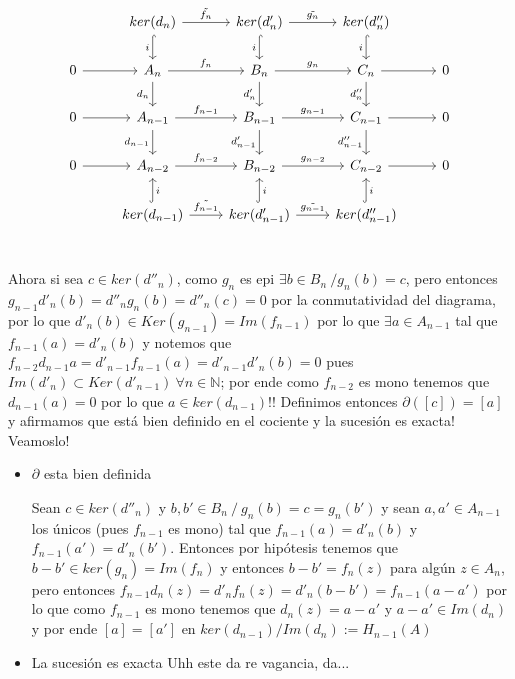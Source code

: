 \documentclass[11pt,a4paper,oneside]{article}
\newcommand{\N}{{\mathbb{N}}}
\newenvironment{proof}[1][Demostraci\'on]{\begin{trivlist}
\item[\hskip \labelsep {\bfseries #1}]}{\end{trivlist}}
\begin{document}
\begin{enumerate}
\begin{proof}
\[
\begin{tikzcd}
& ker(d_n) \arrow[swap,hook]{d}{i} \arrow{r}{\tilde{f_n}} & ker(d'_n) \arrow[swap,hook]{d}{i} \arrow{r}{\tilde{g_n}} & ker(d''_n) \arrow[swap,hook]{d}{i} & \\
0 \rar & A_n \arrow[swap]{d}{d_n} \arrow{r}{f_n} & B_n \arrow[swap]{d}{d'_n} \arrow{r}{g_n} & C_n \arrow[swap]{d}{d''_n} \rar & 0 \\
0 \rar & A_{n-1} \arrow{r}{f_{n-1}} \arrow[swap]{d}{d_{n-1}} & B_{n-1} \arrow{r}{g_{n-1}} \arrow[swap]{d}{d'_{n-1}} & C_{n-1} \rar \arrow[swap]{d}{d''_{n-1}} & 0 \\
0 \rar & A_{n-2} \arrow{r}{f_{n-2}} & B_{n-2} \arrow{r}{g_{n-2}}& C_{n-2} \rar & 0 \\
& ker(d_{n-1}) \arrow[swap,hook]{u}{i} \arrow{r}{\tilde{f_{n-1}}} & ker(d'_{n-1}) \arrow[swap,hook]{u}{i} \arrow{r}{\tilde{g_{n-1}}} & ker(d''_{n-1}) \arrow[swap,hook]{u}{i} & \\
\end{tikzcd}
\]

Ahora si sea $c \in ker(d''_n)$, como $g_n$ es epi $\exists b \in B_n \ / g_n(b)=c$, pero entonces $g_{n-1}d'_n(b) = d''_n g_n(b)= d''_n(c) = 0$ por la conmutatividad del diagrama, por lo que $d'_n(b) \in Ker(g_{n-1})=Im(f_{n-1})$ por lo que $\exists a \in A_{n-1}$ tal que $f_{n-1}(a)=d'_n(b)$ y notemos que $f_{n-2}d_{n-1}a = d'_{n-1}f_{n-1}(a)=d'_{n-1}d'_{n}(b)=0$ pues $Im(d'_n)\subset Ker(d'_{n-1}) \ \forall n \in \N$; por ende como $f_{n-2}$ es mono tenemos que $d_{n-1}(a)=0$ por lo que $a \in ker(d_{n-1})$!! Definimos entonces $\partial([c])=[a]$ y afirmamos que est\'a bien definido en el cociente y la sucesi\'on es exacta! Veamoslo!

\begin{itemize}

\item {$\partial$ esta bien definida}

Sean $c \in ker(d''_n)$ y $b,b' \in B_n \ / \ g_n(b)=c=g_n(b')$ y sean $a,a' \in A_{n-1}$ los \'unicos (pues $f_{n-1}$ es mono) tal que $f_{n-1}(a)=d'_n(b)$ y $f_{n-1}(a')=d'_n(b')$. Entonces por hip\'otesis tenemos que $b-b' \in ker(g_n)=Im(f_n)$ y entonces $b-b'=f_n(z)$ para alg\'un $z \in A_n$, pero entonces $f_{n-1}d_n(z)=d'_nf_{n}(z)=d'_n(b-b')=f_{n-1}(a-a')$ por lo que como $f_{n-1}$ es mono tenemos que $d_n (z)=a-a'$ y $a-a' \in Im(d_n)$ y por ende $[a]=[a']$ en $ker(d_{n-1}) / Im(d_{n}) := H_{n-1}(A)$

\item {La sucesi\'on es exacta}
Uhh este da re vagancia, da...



\end{itemize}
\end{proof}
\end{enumerate}
\end{document}
